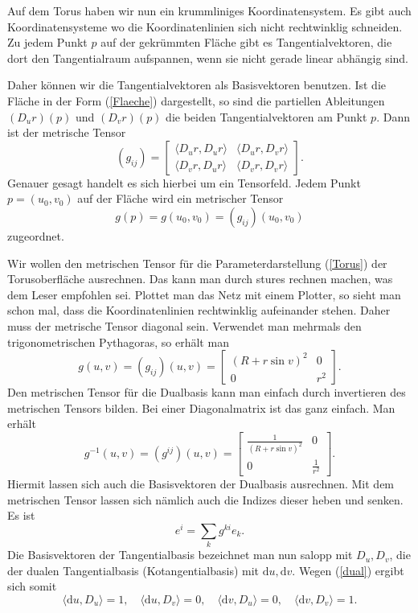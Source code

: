 \documentclass[a4paper,12pt,fleqn]{article}
\begin{document}
Auf dem Torus haben wir nun ein krummliniges Koordinatensystem.
Es gibt auch Koordinatensysteme wo die Koordinatenlinien sich
nicht rechtwinklig schneiden. Zu jedem Punkt $p$ auf der gekrümmten
Fläche gibt es Tangentialvektoren, die dort den Tangentialraum
aufspannen, wenn sie nicht gerade linear abhängig sind.

Daher können wir die Tangentialvektoren als Basisvektoren benutzen.
Ist die Fläche in der Form (\ref{Flaeche}) dargestellt, so sind
die partiellen Ableitungen $(D_u r)(p)$ und $(D_v r)(p)$ die
beiden Tangentialvektoren am Punkt $p$. Dann ist der metrische Tensor
\begin{equation}
(g_{ij}) = \begin{bmatrix}
\langle D_u r,D_u r\rangle & \langle D_u r, D_v r\rangle\\
\langle D_v r,D_u r\rangle & \langle D_v r, D_v r\rangle
\end{bmatrix}.
\end{equation}
Genauer gesagt handelt es sich hierbei um ein Tensorfeld. Jedem
Punkt $p=(u_0,v_0)$ auf der Fläche wird ein metrischer Tensor
\begin{equation}
g(p) = g(u_0,v_0) = (g_{ij})(u_0,v_0)
\end{equation}
zugeordnet.

Wir wollen den metrischen Tensor für die Parameterdarstellung
(\ref{Torus}) der Torusoberfläche ausrechnen. Das kann man
durch stures rechnen
machen, was dem Leser empfohlen sei. Plottet man das Netz mit
einem Plotter, so sieht man schon mal, dass die Koordinatenlinien
rechtwinklig aufeinander stehen. Daher muss der metrische Tensor
diagonal sein. Verwendet man mehrmals den trigonometrischen
Pythagoras, so erhält man
\begin{equation}
g(u,v) = (g_{ij})(u,v)= \begin{bmatrix}
(R+r\sin v)^2 & 0\\
0 & r^2
\end{bmatrix}.
\end{equation}
Den metrischen Tensor für die Dualbasis kann man einfach durch
invertieren des metrischen Tensors bilden. Bei einer Diagonalmatrix
ist das ganz einfach. Man erhält
\begin{equation}
g^{-1}(u,v) = (g^{ij})(u,v)= \begin{bmatrix}
\frac{1}{(R+r\sin v)^2} & 0\\
0 & \frac{1}{r^2}
\end{bmatrix}.
\end{equation}
Hiermit lassen sich auch die Basisvektoren der Dualbasis ausrechnen.
Mit dem metrischen Tensor lassen sich nämlich auch die Indizes
dieser heben und senken. Es ist
\begin{equation}\label{Bvheben}
e^i = \sum_{k} g^{ki}e_k.
\end{equation}
Die Basisvektoren der Tangentialbasis bezeichnet man nun salopp
mit $D_u,D_v$, die der dualen Tangentialbasis (Kotangentialbasis)
mit $\mathrm du,\mathrm dv$. Wegen (\ref{dual}) ergibt sich
somit
\begin{equation}\label{Tdual}
\langle\mathrm du,D_u\rangle=1,\quad
\langle\mathrm du,D_v\rangle=0,\quad
\langle\mathrm dv,D_u\rangle=0,\quad
\langle\mathrm dv,D_v\rangle=1.
\end{equation}
\end{document}
